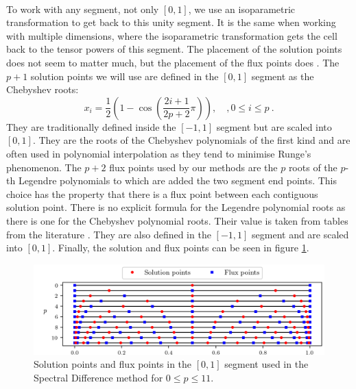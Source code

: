       \paragraph{}
      To work with any segment, not only $\left[0, 1\right]$, we use an isoparametric transformation to get back to this unity segment.
      It is the same when working with multiple dimensions, where the isoparametric transformation gets the cell back to the tensor powers of this segment.
      The placement of the solution points does not seem to matter much, but the placement of the flux points does \cite{VandenAbeeleLacorWang2008}.
      The $p + 1$ solution points we will use are defined in the $\left[0, 1\right]$ segment as the Chebyshev roots:
      \begin{equation}
        x_i = \frac{1}{2} \left(1 - \cos\left(\frac{2i + 1}{2p + 2} \pi\right)\right), \quad, 0 \leq i \leq p \ .
      \end{equation}
      They are traditionally defined inside the $\left[-1, 1\right]$ segment but are scaled into $\left[0, 1\right]$.
      They are the roots of the Chebyshev polynomials of the first kind and are often used in polynomial interpolation as they tend to minimise Runge's phenomenon.
      The $p + 2$ flux points used by our methods are the $p$ roots of the $p$-th Legendre polynomials to which are added the two segment end points.
      This choice has the property that there is a flux point between each contiguous solution point.
      There is no explicit formula for the Legendre polynomial roots as there is one for the Chebyshev polynomial roots.
      Their value is taken from tables from the literature .
      They are also defined in the $\left[-1, 1\right]$ segment and are scaled into $\left[0, 1\right]$.
      Finally, the solution and flux points can be seen in figure \ref{fig:sd_points}.

      \begin{figure}
        \centering
        \includegraphics{figures/sd_points.png}
        \caption{Solution points and flux points in the $\left[0, 1\right]$ segment used in the Spectral Difference method for $0 \leq p \leq 11$.}
        \label{fig:sd_points}
      \end{figure}

